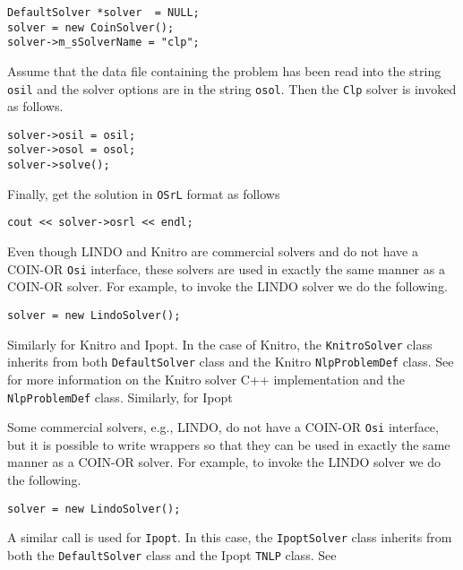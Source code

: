 \begin{verbatim}
DefaultSolver *solver  = NULL;
solver = new CoinSolver();
solver->m_sSolverName = "clp";
\end{verbatim}

Assume that the data file containing the problem has been read into
the string {\tt osil} and the solver options are in the string {\tt osol}.
Then the {\tt Clp} solver is invoked as follows.

\begin{verbatim}
solver->osil = osil;
solver->osol = osol;
solver->solve();
\end{verbatim}

Finally, get the solution in {\tt OSrL} format as follows

\begin{verbatim}
cout << solver->osrl << endl;
\end{verbatim}

\ifknitro   %
Even though LINDO and Knitro are commercial solvers and do not have a COIN-OR {\tt Osi} interface, these solvers are
used in exactly the same manner as a COIN-OR solver. For example, to invoke the LINDO solver we do the following.

\begin{verbatim}
solver = new LindoSolver();
\end{verbatim}

Similarly for Knitro and Ipopt. In the case of  Knitro, the {\tt KnitroSolver} class inherits from both
{\tt DefaultSolver} class and the Knitro {\tt NlpProblemDef} class. See {\tt\UrlKnitroMan} for more information 
on the Knitro solver C++ implementation and the {\tt NlpProblemDef} class.  Similarly, for Ipopt 
\else

Some commercial solvers, e.g., LINDO, do not have a COIN-OR {\tt Osi} interface, 
but it is possible to write wrappers so that they can be used in exactly the same manner 
as a COIN-OR solver. For example, to invoke the
LINDO solver we do the following.

\begin{verbatim}
solver = new LindoSolver();
\end{verbatim}

A similar call is used for {\tt Ipopt}. In this case, 
\fi         %
the {\tt IpoptSolver} class inherits from both the {\tt DefaultSolver} class and the Ipopt {\tt TNLP} class. See 

